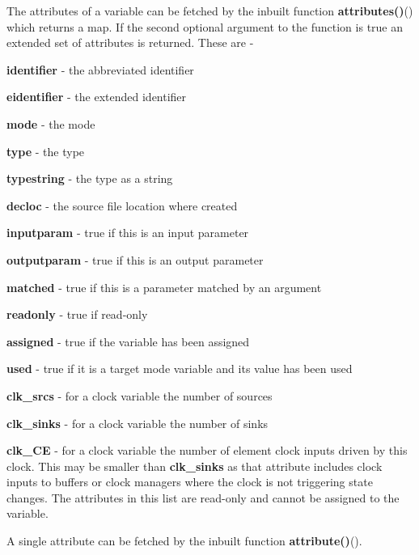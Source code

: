             The attributes of a variable can be fetched by the
            inbuilt function {\bf attributes()}()
            which returns a map. If the second optional argument to the
            function is true an extended set of attributes is returned. These
            are -
            \blist
            \item    {\bf identifier} - the abbreviated identifier
            \item    {\bf eidentifier} - the extended identifier
            \item    {\bf mode} - the mode
            \item    {\bf type} - the type
            \item    {\bf typestring} - the type as a string
            \item    {\bf decloc} - the source file location where created
            \item    {\bf inputparam} - true if this is an input parameter
            \item    {\bf outputparam} - true if this is an output parameter
            \item    {\bf matched} - true if this is a parameter matched by an argument
            \item    {\bf readonly} - true if read-only
            \item    {\bf assigned} - true if the variable has been assigned
            \item    {\bf used} - true if it is a target mode variable and its
                                value has been used
            \item    {\bf clk\_srcs} - for a clock variable the number of sources
            \item    {\bf clk\_sinks} - for a clock variable the number of sinks
            \item    {\bf clk\_CE} - for a clock variable the number of element
                                clock inputs driven by this clock. This may be
                                smaller than {\bf clk\_sinks} as that attribute
                                includes clock inputs to buffers or clock managers
                                where the clock is not triggering state changes.
            \blend
            The attributes in this list are read-only and cannot be assigned to
            the variable.
            
            A single attribute can be fetched by the inbuilt function
            {\bf attribute()}().
            
